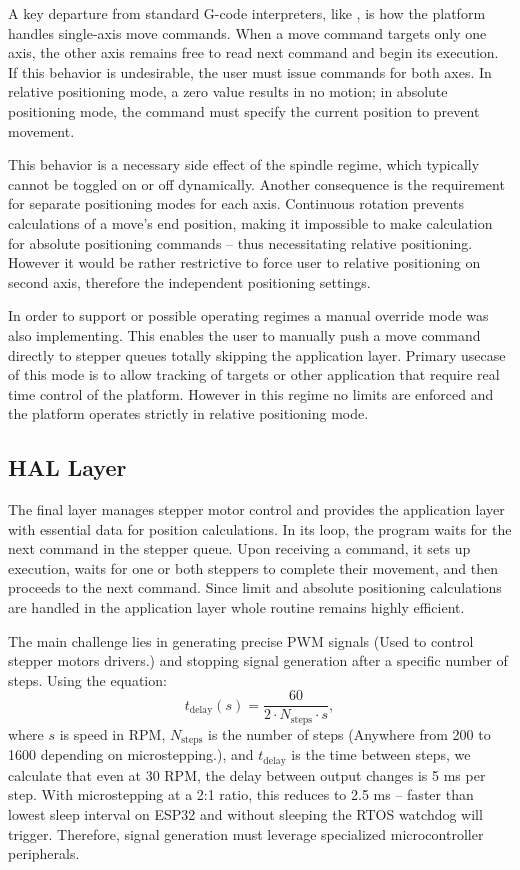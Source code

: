 A key departure from standard G-code interpreters, like \cite{duet}, is how the platform handles single-axis move commands.
When a move command targets only one axis, the other axis remains free to read next command and begin its execution.
If this behavior is undesirable, the user must issue commands for both axes.
In relative positioning mode, a zero value results in no motion; in absolute positioning mode, the command must specify the current position to prevent movement.

This behavior is a necessary side effect of the spindle regime, which typically cannot be toggled on or off dynamically.
Another consequence is the requirement for separate positioning modes for each axis.
Continuous rotation prevents calculations of a move’s end position, making it impossible to make calculation for absolute positioning commands -- thus necessitating relative positioning.
However it would be rather restrictive to force user to relative positioning on second axis, therefore the independent positioning settings.

In order to support or possible operating regimes a manual override mode was also implementing.
This enables the user to manually push a move command directly to stepper queues totally skipping the application layer.
Primary usecase of this mode is to allow tracking of targets or other application that require real time control of the platform.
However in this regime no limits are enforced and the platform operates strictly in relative positioning mode.


\subsection{HAL Layer}

The final layer manages stepper motor control and provides the application layer with essential data for position calculations.
In its loop, the program waits for the next command in the stepper queue.
Upon receiving a command, it sets up execution, waits for one or both steppers to complete their movement, and then proceeds to the next command.
Since limit and absolute positioning calculations are handled in the application layer whole routine remains highly efficient.

The main challenge lies in generating precise PWM signals (Used to control stepper motors drivers.) and stopping signal generation after a specific number of steps.
Using the equation:
%
\begin{equation}
  t_{\mathrm{delay}}(s) = \frac{60}{2\cdot N_{\mathrm{steps}} \cdot s},
  \label{eq:delay}
\end{equation}
%
where $s$ is speed in RPM, $N_{\mathrm{steps}}$ is the number of steps (Anywhere from 200 to 1600 depending on microstepping.), and $t_{\mathrm{delay}}$ is the time between steps, we calculate that even at 30 RPM, the delay between output changes is 5 ms per step.
With microstepping at a 2:1 ratio, this reduces to 2.5 ms -- faster than lowest sleep interval on ESP32 and without sleeping the RTOS watchdog will trigger.
Therefore, signal generation must leverage specialized microcontroller peripherals.

